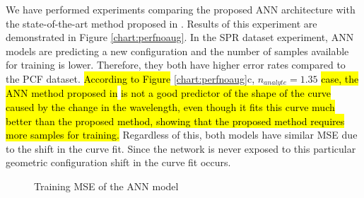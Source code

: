 \documentclass[journal]{IEEEtran}
\begin{document}
We have performed experiments comparing the proposed ANN architecture with the state-of-the-art method proposed in \cite{paper0}. Results of this experiment are demonstrated in Figure \ref{chart:perfnoaug}. In the SPR dataset experiment, ANN models are predicting a new configuration and the number of samples available for training is lower. Therefore, they both have higher error rates compared to the PCF dataset. \hl{According to Figure} \ref{chart:perfnoaug}c, $n_{analyte} = 1.35$ \hl{case, the ANN method proposed in }\cite{paper0}\hl{ is not a good predictor of the shape of the curve caused by the change in the wavelength, even though it fits this curve much better than the proposed method, showing that the proposed method requires more samples for training.}
Regardless of this, both models have similar MSE due to the shift in the curve fit. Since the network is never exposed to this particular geometric configuration shift in the curve fit occurs. 

\begin{figure}
	\begin{subfigure}{.48\textwidth}
		\centering
	\end{subfigure}	
	
	
	\caption{Training MSE of the ANN model}
	\label{chart:trainingmse}
\end{figure}
\end{document}
